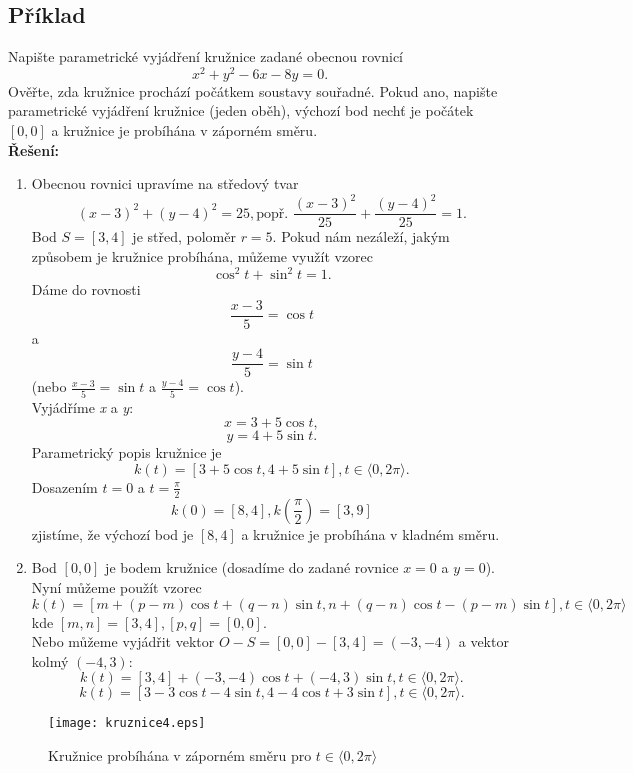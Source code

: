 	\subsection*{Příklad}
	Napište parametrické vyjádření kružnice zadané obecnou rovnicí
	$$x^2+y^2-6x-8y=0.$$
	Ověřte, zda kružnice prochází počátkem soustavy souřadné. Pokud ano, napište parametrické
	vyjádření kružnice (jeden oběh), výchozí bod nechť je počátek $[0, 0]$ a kružnice je probíhána
	v záporném směru. \\[10pt]
	\textbf{Řešení:}
	\begin{enumerate}
		\item Obecnou rovnici upravíme na středový tvar
		      $$(x-3)^2+(y-4)^2=25, \text{popř. } \frac{(x-3)^2}{25} + \frac{(y-4)^2}{25}=1.$$
		      Bod $S=[3, 4]$ je střed, poloměr $r=5$. Pokud nám nezáleží, jakým způsobem je kružnice
		      probíhána, můžeme využít vzorec
		      $$\cos^2{t}+\sin^2{t}=1.$$
		      Dáme do rovnosti
		      $$\frac{x-3}{5} = \cos{t}$$
		      a
		      $$\frac{y-4}{5}=\sin{t}$$
		      (nebo $\frac{x-3}{5} = \sin{t}$ a $\frac{y-4}{5}=\cos{t}$). \\
		      Vyjádříme \textit{x} a \textit{y}:
		      $$x=3+5\cos{t},$$
		      $$y=4+5\sin{t}.$$
		      Parametrický popis kružnice je
		      $$k(t) = [3+5\cos{t}, 4+5\sin{t}], t \in \langle0,2\pi\rangle. $$
		      Dosazením $t=0$ a $t=\frac{\pi}{2}$
		      $$k(0) = [8, 4], k\left(\frac{\pi}{2}\right) = [3, 9]$$
		      zjistíme, že výchozí bod je $[8, 4]$ a kružnice je probíhána v kladném směru.
		\item Bod $[0, 0]$ je bodem kružnice (dosadíme do zadané rovnice $x=0$ a $y=0$). \\
		      Nyní můžeme použít vzorec
		      $$k(t)=[m + (p-m)\cos{t} + (q-n)\sin{t}, n + (q-n)\cos{t}-(p-m)\sin{t}], t \in \langle0, 2\pi\rangle$$
		      kde $[m, n] = [3, 4], [p, q] = [0, 0]$. \\[5pt]
		      	Nebo můžeme vyjádřit vektor $O-S=[0, 0] - [3, 4] = (-3, -4)$ a vektor kolmý $(-4, 3)$: \\
		      	$$k(t) = [3, 4] + (-3, -4)\cos{t}+(-4, 3)\sin{t}, t \in \langle0, 2\pi\rangle.$$
		      	$$k(t) = [3-3\cos{t}-4\sin{t}, 4-4\cos{t}+3\sin{t}], t \in \langle0, 2\pi\rangle.$$
		      \end{enumerate}
		      \begin{figure}[H]
		      	\centering
		      	\texttt{[image: kruznice4.eps]}
		      	\caption{Kružnice probíhána v záporném směru  pro $t \in \langle0, 2\pi\rangle$}
		      						
		      \end{figure}
		      \clearpage
